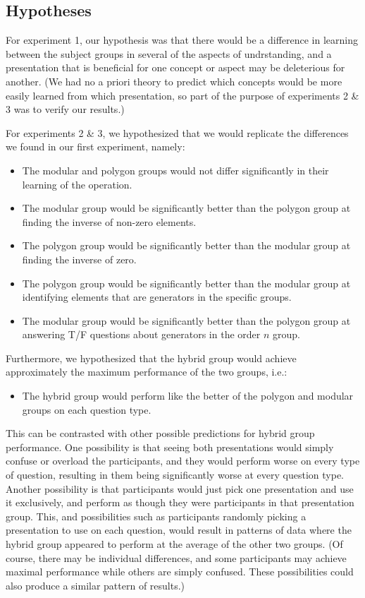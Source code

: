 \documentclass[man,mask,10pt]{apa6}
\begin{document}
\subsection{Hypotheses}
For experiment 1, our hypothesis was that there would be a difference in learning between the subject groups in several of the aspects of undrstanding, and a presentation that is beneficial for one concept or aspect may be deleterious for another. (We had no a priori theory to predict which concepts would be more easily learned from which presentation, so part of the purpose of experiments 2 \& 3 was to verify our results.)\par
For experiments 2 \& 3, we hypothesized that we would replicate the differences we found in our first experiment, namely: 
\begin{itemize} 
\item The modular and polygon groups would not differ significantly in their learning of the operation.
\item The modular group would be significantly better than the polygon group at finding the inverse of non-zero elements.
\item The polygon group would be significantly better than the modular group at finding the inverse of zero.
\item The polygon group would be significantly better than the modular group at identifying elements that are generators in the specific groups.
\item The modular group would be significantly better than the polygon group at answering T/F questions about generators in the order $n$ group.
\end{itemize}
Furthermore, we hypothesized that the hybrid group would achieve approximately the maximum performance of the two groups, i.e.:
\begin{itemize}
\item The hybrid group would perform like the better of the polygon and modular groups on each question type. 
\end{itemize}
This can be contrasted with other possible predictions for hybrid group performance. One possibility is that seeing both presentations would simply confuse or overload the participants, and they would perform worse on every type of question, resulting in them being significantly worse at every question type. Another possibility is that participants would just pick one presentation and use it exclusively, and perform as though they were participants in that presentation group. This, and possibilities such as participants randomly picking a presentation to use on each question, would result in patterns of data where the hybrid group appeared to perform at the average of the other two groups. (Of course, there may be individual differences, and some participants may achieve maximal performance while others are simply confused. These possibilities could also produce a similar pattern of results.) \par
\end{document}
